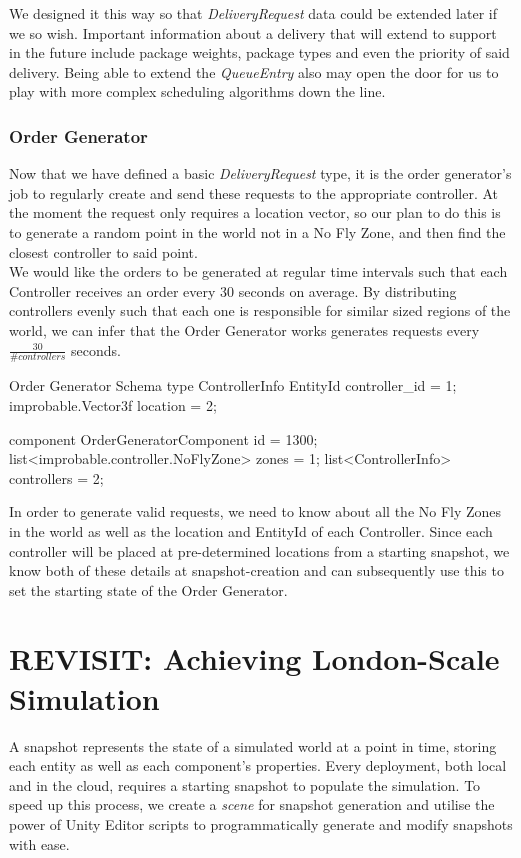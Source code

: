 \documentclass[a4paper,12pt,titlepage]{article}
\begin{document}
We designed it this way so that \textit{DeliveryRequest} data could be extended later if we so wish. Important information about a delivery that will extend to support in the future include package weights, package types and even the priority of said delivery. Being able to extend the \textit{QueueEntry} also may open the door for us to play with more complex scheduling algorithms down the line.

\subsubsection{Order Generator}
Now that we have defined a basic \textit{DeliveryRequest} type, it is the order generator's job to regularly create and send these requests to the appropriate controller. At the moment the request only requires a location vector, so our plan to do this is to generate a random point in the world not in a No Fly Zone, and then find the closest controller to said point.\\

We would like the orders to be generated at regular time intervals such that each Controller receives an order every 30 seconds on average. By distributing controllers evenly such that each one is responsible for similar sized regions of the world, we can infer that the Order Generator works generates requests every $\frac{30}{\#controllers}$ seconds.\\

\begin{sexylisting}[colback=white]{Order Generator Schema}
type ControllerInfo {
  EntityId controller_id = 1;
  improbable.Vector3f location = 2;
}

component OrderGeneratorComponent {
  id = 1300;
  list<improbable.controller.NoFlyZone> zones = 1;
  list<ControllerInfo> controllers = 2;
}
\end{sexylisting}

In order to generate valid requests, we need to know about all the No Fly Zones in the world as well as the location and EntityId of each Controller. Since each controller will be placed at pre-determined locations from a starting snapshot, we know both of these details at snapshot-creation and can subsequently use this to set the starting state of the Order Generator.

\section{REVISIT: Achieving London-Scale Simulation}
A snapshot represents the state of a simulated world at a point in time, storing each entity as well as each component's properties. Every deployment, both local and in the cloud, requires a starting snapshot to populate the simulation. To speed up this process, we create a \textit{scene} for snapshot generation and utilise the power of Unity Editor scripts to programmatically generate and modify snapshots with ease.
\end{document}
